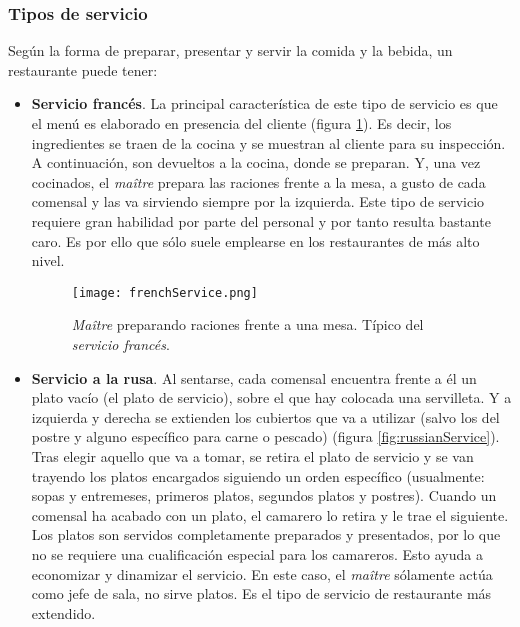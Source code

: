     \subsubsection{Tipos de servicio}
  Según la forma de preparar, presentar y servir la comida y la bebida, un
  restaurante puede tener\cite{bib:wiki}:
  \begin{itemize}
  \item \textbf{Servicio francés}. La principal característica de este tipo de
  servicio es que el menú es elaborado en presencia del cliente (figura
  \ref{fig:frenchService}). Es decir, los ingredientes se traen de la cocina y
  se muestran al cliente para su inspección. A continuación, son devueltos a la
  cocina, donde se preparan. Y, una vez cocinados, el \emph{maître} prepara las
  raciones frente a la mesa, a gusto de cada comensal y las va sirviendo 
  siempre por la izquierda. Este tipo de servicio requiere gran habilidad por 
  parte del personal y por tanto resulta bastante caro. Es por ello que sólo 
  suele emplearse en los restaurantes de más alto nivel.

  \begin{figure}[!h]
    \begin{center}
      \texttt{[image: frenchService.png]}
      \caption{\emph{Maître} preparando raciones frente a una mesa. Típico del 
      \emph{servicio francés}.}
      \label{fig:frenchService}
    \end{center}
  \end{figure}

  \item \textbf{Servicio a la rusa}. Al sentarse, cada comensal encuentra 
  frente a él un plato vacío (el plato de servicio), sobre el que hay colocada 
  una servilleta. Y a izquierda y derecha se extienden los cubiertos que va a
  utilizar (salvo los del postre y alguno específico para carne o pescado)
  (figura \ref{fig:russianService}). Tras elegir aquello que va a tomar, se
  retira el plato de servicio y se van trayendo los platos encargados 
  siguiendo un orden específico (usualmente: sopas y entremeses, primeros 
  platos, segundos platos y postres). Cuando un comensal ha acabado con un 
  plato, el camarero lo retira y le trae el siguiente. Los platos son servidos 
  completamente preparados y presentados, por lo que no se requiere una 
  cualificación especial para los camareros. Esto ayuda a economizar y 
  dinamizar el servicio. En este caso, el \emph{maître} sólamente actúa como 
  jefe de sala, no sirve platos. Es el tipo de servicio de restaurante más 
  extendido.


\end{itemize}
